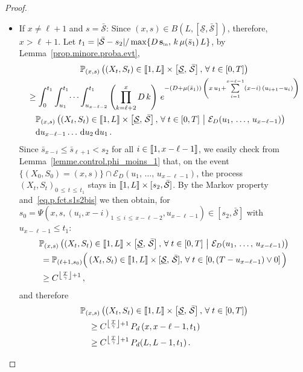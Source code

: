 \documentclass[AHL,Unicode,longabstracts,published]{cedram}
\newcommand{\llbracket}{\mathopen{[\mkern -2.7mu[}}
\newcommand{\rrbracket}{\mathclose{]\mkern -2.7mu]}}
\newcommand{\PP}{\mathbb{P}}
\newcommand{\clE}{\mathcal{E}}
\newcommand{\Sin}{{\mathbf s}_{\textrm{\tiny\rm in}}}
\newcommand{\dif}{\mathrm{d}}
\newcommand{\Smin}{\underline{\mathcal{S}}}
\newcommand{\Smax}{\bar{\mathcal{S}}}
\newcommand{\barmu}{\mu(\bar s_1)}
\newcommand{\setunL}{\llbracket 1, L\rrbracket}
\newcommand{\1}{\mathbf{1}}
\let\oldforall\forall
\renewcommand*{\forall}{\mathrel{\oldforall}}
\begin{document}
\begin{proof}
\begin{itemize}
\item If $x\neq \ell+1$ and $s=\Smax$: Since $(x,s)\in B(L,[\Smin,\Smax])$, therefore, $x>\ell+1$. Let $t_1 = |\Smax-s_2|/\max\{D\,\Sin,\, k\,\barmu\,L\}$, by Lemma~\ref{prop.minore.proba.evt},
\begin{multline*}
\PP_{(x,s)}
\left(\left(X_t,S_t\right) \in \setunL \times \left[\Smin, \, \Smax\right], \,
\forall t\in[0,T]\right)
\\
\begin{aligned}
&
\geq \int_0^{t_1} \int_{u_1}^{t_1}\dots \int_{u_{x-\ell-2}}^{t_1}
\left(\prod_{k=\ell+2}^{x}D\,k\right)\, e^{-(D+\barmu)\,\left(x\,u_1+
\sum\limits_{i=1}^{x-\ell-1}(x-i)\,\left(u_{i+1}-u_{i}\right)\right)}\,
\\
&\quad
\PP_{(x,s)}
\left(\left(X_t,S_t\right) \in \setunL\times \left[\Smin, \, \Smax\right], \,
\forall t\in[0,T] \ \middle| \ \clE_D(u_1,\,\dots,\,u_{x-\ell-1})\right)\,
\\
& \quad
\dif u_{x-\ell-1}\dots\,\dif u_2\,\dif u_1\,.
\end{aligned}
\end{multline*}
Since $\bar s_{x-i}\leq \bar s_{\ell+1}<s_2$ for all $i\in \llbracket 1,x-\ell-1 \rrbracket$, we easily check from Lemma~\ref{lemme.control.phi_moins_1} that, on the event $\{(X_0,S_0)=(x,s)\}\cap\clE_D(u_1,\,\dots,\,u_{x-\ell-1})$, the process $(X_t,S_t)_{0\,\leq\,t\,\leq\,t_1}$ stays in $\setunL \times [s_2,\Smax]$. By the Markov property and~\eqref{eq.p.fct.s1s2bis} we then obtain, for $s_0=\Psi(x,s,(u_i,x-i)_{1\,\leq\,i\,\leq\,x-\ell-2},u_{x-\ell-1})\in [s_2,\Smax]$ with $u_{x-\ell-1}\leq t_1$:
\begin{multline*}
\PP_{(x,s)}
\left(\left(X_t,S_t\right) \in \setunL \times \left[\Smin, \, \Smax\right], \,
\forall t\in[0,T] \ \middle| \ \clE_D(u_1,\,\dots,\,u_{x-\ell-1})\right)
\\
\begin{aligned}
&= \PP_{(\ell+1,s_0)}
\Big(\left(X_t,S_t\right) \in \setunL \times [\Smin, \, \Smax], \,
\forall t\in\left[0,(T-u_{x-\ell-1})\vee 0\right] \Big)
\\
&\geq C^{\left\lfloor\frac{T}{\gamma}\right\rfloor+1}\,,
\end{aligned}
\end{multline*}
and therefore
\begin{align*}
& \PP_{(x,s)}
\left(\left(X_t,S_t\right) \in \setunL \times \left[\Smin, \, \Smax\right], \,
\forall t\in[0,T]\right)
\\
& \quad \geq C^{\left\lfloor\frac{T}{\gamma}\right\rfloor+1}
\,P_d\left(x,x-\ell-1, t_1\right)
\\
&
\quad\geq C^{\left\lfloor\frac{T}{\gamma}\right\rfloor+1}\, P_d(L,L-1, t_1)\,.
\end{align*}


\end{itemize}
\end{proof}
\end{document}
